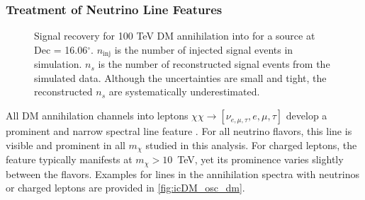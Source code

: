 \subsubsection{Treatment of Neutrino Line Features}\label{sec:icDM_nu_lines}
\begin{figure}[h]
    \caption{Signal recovery for 100 TeV DM annihilation into \parpar{\nu_\mu} for a source at Dec = 16.06$^\circ$. $n_\mathrm{inj}$ is the number of injected signal events in simulation. $n_s$ is the number of reconstructed signal events from the simulated data. Although the uncertainties are small and tight, the reconstructed $ n_s $ are systematically underestimated.} \label{fig:sig_recovery_fail}
\end{figure}

All DM annihilation channels into leptons $ \chi\chi \rightarrow [\nu_{e, \mu, \tau}, e, \mu,\tau] $ develop a prominent and narrow spectral line feature \cite{Rodd:HDM_spec,Charon}.
For all neutrino flavors, this line is visible and prominent in all $m_\chi$ studied in this analysis.
For charged leptons, the feature typically manifests at $m_\chi > 10$~TeV, yet its prominence varies slightly between the flavors.
Examples for lines in the annihilation spectra with neutrinos or charged leptons are provided in \cref{fig:icDM_osc_dm}.

